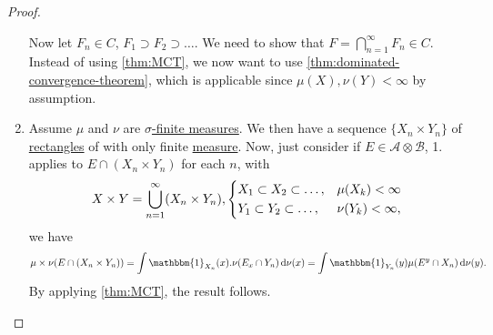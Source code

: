\begin{proof}
\begin{enumerate}
		      \par Now let \(F_{n} \in C\), \(F_1\supset F_2\supset \dots  \). We need to show that \(F = \bigcap_{n=1}^{\infty} F_{n} \in C\).
		      Instead of using \autoref{thm:MCT}, we now want to use \autoref{thm:dominated-convergence-theorem}, which is applicable since \(\mu (X), \nu (Y)< \infty \)
		      by assumption.
		\item Assume \(\mu\) and \(\nu \) are \hyperref[def:sigma-finite-measure]{\(\sigma \)-finite measures}. We then have a sequence \(\{X_n \times Y_n\}\)
		      of \hyperref[def:rectangle]{rectangles} of with only finite \hyperref[def:measure]{measure}. Now, just consider if \(E\in \mathcal{A} \otimes \mathcal{B} \),
		      1. applies to \(E \cap (X_{n} \times Y_{n} )\) for each \(n\), with
		      \[
			      X\times Y = \bigcup_{n=1}^{\infty} (X_{n} \times Y_{n} ), \begin{dcases}
				      X_1\subset X_2\subset \dots , & \mu (X_{k} )< \infty   \\
				      Y_1\subset Y_2\subset \dots , & \nu (Y_{k} )< \infty ,
			      \end{dcases}
		      \]
		      we have
		      \[
			      \mu \times \nu (E \cap (X_{n} \times Y_{n} )) = \int \mathbbm{1}_{X_{n} } (x) . \nu (E_{x} \cap Y_{n} )\,\mathrm{d} \nu (x) = \int \mathbbm{1}_{Y_{n} } (y)\mu (E^y \cap X_{n} )\,\mathrm{d} \nu (y).
		      \]
		      By applying \autoref{thm:MCT}, the result follows.
	\end{enumerate}
\end{proof}

